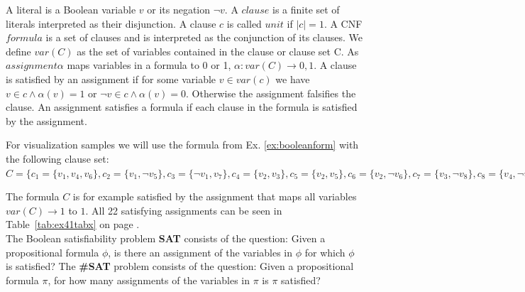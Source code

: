 \documentclass[a4paper, 12pt, bibliography=totoc]{scrartcl}
\begin{document}
A literal is a Boolean variable $v$ or its negation $\neg v$. A $clause$ is a finite set of literals interpreted as their disjunction. A clause $c$ is called $unit$ if $|c|=1$. A CNF $formula$ is a set of clauses and is interpreted as the conjunction of its clauses. We define $var(C)$ as the set of variables contained in the clause or clause set C. As $assignment \alpha$ maps variables in a formula to 0 or 1, $\alpha : var(C)\rightarrow 0,1$. A clause is satisfied by an assignment if for some variable $v \in var(c)$ we have $v \in c \land \alpha (v)=1$ {or} $\neg v \in c \land \alpha(v)=0$. Otherwise the assignment falsifies the clause. An assignment satisfies a formula if each clause in the formula is satisfied by the assignment. \\
\begin{example}\label{ex:example41}
	For visualization samples we will use the formula from Ex. \ref{ex:booleanform} with the following clause set: $C=\{c_{1}=\{v_{1},v_{4},v_{6}\},
	c_{2}=\{v_{1},\neg v_{5}\},
	c_{3}=\{\neg v_{1},v_{7}\},
	c_{4}=\{v_{2},v_{3}\},
	c_{5}=\{v_{2},v_{5}\},
	c_{6}=\{v_{2},\neg v_{6}\},
	c_{7}=\{v_{3},\neg v_{8}\},
	c_{8}=\{v_{4},\neg v_{8}\},
	c_{9}=\{\neg v_{4},v_{6}\},
	c_{10}=\{\neg v_{4},v_{7}\}\}$
\end{example}
\vskip 12pt
The formula $C$ is for example satisfied by the assignment that maps all variables $var(C)\rightarrow 1$ to $1$. 
All 22 satisfying assignments can be seen in Table~\ref{tab:ex41tabx} on page \pageref{tab:ex41tabx}.\\

The Boolean satisfiability problem \textbf{SAT} consists of the question: Given a propositional formula $\phi$, is there an assignment of the variables in $\phi$ for which $\phi$ is satisfied?
The \textbf{\#SAT} problem consists of the question: Given a propositional formula $\pi$, for how many assignments of the variables in $\pi$ is $\pi$ satisfied?\\
\end{document}
